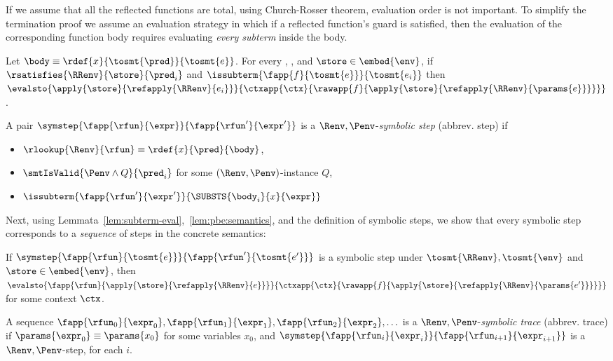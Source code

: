 %
If we assume that all the reflected functions are total, 
using Church-Rosser theorem, evaluation order is not important. 
%
To simplify the termination proof we assume 
an evaluation strategy in which  
if a reflected function's guard is satisfied, 
then the evaluation of the corresponding function body
requires evaluating \emph{every subterm}
inside the body.

\begin{assumption}\label{lem:subterm-eval}
Let $\body \equiv \rdef{x}{\tosmt{\pred}}{\tosmt{e}}$.
%
For every \env, \RRenv, and $\store \in \embed{\env}$,  
if $\rsatisfies{\RRenv}{\store}{\pred_i}$ and $\issubterm{\fapp{f}{\tosmt{e}}}{\tosmt{e_i}}$
then
$\evalsto{{\apply{\store}{\refapply{\RRenv}{e_i}}}}{\ctxapp{\ctx}{\rawapp{f}{\apply{\store}{\refapply{\RRenv}{\params{e}}}}}}$.
\end{assumption}

%
A pair
$\symstep{\fapp{\rfun}{\expr}}{\fapp{\rfun'}{\expr'}}$
is a
$\Renv,\Penv$-\emph{symbolic step} (abbrev. step)
if
%
\begin{itemize}
  \item $\rlookup{\Renv}{\rfun} \equiv \rdef{x}{\pred}{\body}$,
  \item $\smtIsValid{\Penv \wedge Q}{\pred_i}$ for some $(\Renv, \Penv)$-instance $Q$,
  \item $\issubterm{\fapp{\rfun'}{\expr'}}{\SUBSTS{\body_i}{x}{\expr}}$
\end{itemize}

%
Next, using Lemmata~\ref{lem:subterm-eval},~\ref{lem:pbe:semantics}, 
and the definition of symbolic steps, we show that every
symbolic step corresponds
to a \emph{sequence} of steps in the concrete semantics:

\begin{lemma}\label{lem:step-reductions}
If   $\symstep{\fapp{\rfun}{\tosmt{e}}}{\fapp{\rfun'}{\tosmt{e'}}}$
     is a symbolic step under $\tosmt{\RRenv}, \tosmt{\env}$
and $\store\in \embed{\env}$,
then $\evalsto{{\fapp{\rfun}{\apply{\store}{\refapply{\RRenv}{e}}}}}
              {\ctxapp{\ctx}{\rawapp{f}{\apply{\store}{\refapply{\RRenv}{\params{e'}}}}}}$
for some context $\ctx$.
\end{lemma}

%
A sequence
%
$\fapp{\rfun_0}{\expr_0},\fapp{\rfun_1}{\expr_1},\fapp{\rfun_2}{\expr_2},\ldots$
%
is a $\Renv,\Penv$-\emph{symbolic trace} (abbrev. trace)
if $\params{\expr_0} \equiv \params{x_0}$ for some variables $x_0$,
and $\symstep{\fapp{\rfun_i}{\expr_i}}{\fapp{\rfun_{i+1}}{\expr_{i+1}}}$
is a $\Renv,\Penv$-step, for each $i$.

